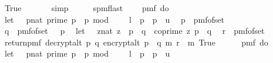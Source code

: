 \begin{isabellebody}
\ \ True{\isachardoublequoteclose}\ \isanewline
\ \ \ \ \isamarkupfalse%
\ simp\isanewline
\isanewline
\ \ \isamarkupfalse%
\ \isamarkupfalse%
\ spmf{\isacharunderscore}{\kern0pt}last{\isacharcolon}{\kern0pt}\ \ {\isachardoublequoteopen}\isanewline
\ \ pmf\ {\isacharparenleft}{\kern0pt}do\ {\isacharbraceleft}{\kern0pt}\isanewline
\ \ let\ {\isasymK}\ {\isacharequal}{\kern0pt}\ {\isacharbraceleft}{\kern0pt}{\isacharparenleft}{\kern0pt}p{\isacharcolon}{\kern0pt}{\isacharcolon}{\kern0pt}nat{\isacharparenright}{\kern0pt}{\isachardot}{\kern0pt}\ prime\ p\ {\isasymand}\ p\ mod\ {}\ {\isacharequal}{\kern0pt}\ {}\ {\isasymand}\ l\ {\isasymle}\ p\ {\isasymand}\ p\ {\isasymle}\ u{\isacharbraceright}{\kern0pt}{\isacharsemicolon}{\kern0pt}\isanewline
\ \ p\ {\isasymleftarrow}\ pmf{\isacharunderscore}{\kern0pt}of{\isacharunderscore}{\kern0pt}set\ {\isasymK}{\isacharsemicolon}{\kern0pt}\ \isanewline
\ \ q\ {\isasymleftarrow}\ pmf{\isacharunderscore}{\kern0pt}of{\isacharunderscore}{\kern0pt}set\ {\isacharparenleft}{\kern0pt}{\isasymK}\ {\isacharminus}{\kern0pt}\ {\isacharbraceleft}{\kern0pt}p{\isacharbraceright}{\kern0pt}{\isacharparenright}{\kern0pt}{\isacharsemicolon}{\kern0pt}\isanewline
\ \ let\ {\isasymZ}\ {\isacharequal}{\kern0pt}\ {\isacharbraceleft}{\kern0pt}{\isacharparenleft}{\kern0pt}z{\isacharcolon}{\kern0pt}{\isacharcolon}{\kern0pt}nat{\isacharparenright}{\kern0pt}{\isachardot}{\kern0pt}\ z\ {\isacharless}{\kern0pt}\ p\ {\isacharasterisk}{\kern0pt}\ q\ {\isasymand}\ coprime\ z\ {\isacharparenleft}{\kern0pt}p\ {\isacharasterisk}{\kern0pt}\ q{\isacharparenright}{\kern0pt}{\isacharbraceright}{\kern0pt}{\isacharsemicolon}{\kern0pt}\isanewline
\ \ r\ {\isasymleftarrow}\ pmf{\isacharunderscore}{\kern0pt}of{\isacharunderscore}{\kern0pt}set\ {\isasymZ}{\isacharsemicolon}{\kern0pt}\isanewline
\ \ return{\isacharunderscore}{\kern0pt}pmf\ {\isacharparenleft}{\kern0pt}decrypt{\isacharunderscore}{\kern0pt}alt\ p\ q\ {\isacharparenleft}{\kern0pt}encrypt{\isacharunderscore}{\kern0pt}alt\ {\isacharparenleft}{\kern0pt}p\ {\isacharasterisk}{\kern0pt}\ q{\isacharparenright}{\kern0pt}\ m\ r{\isacharparenright}{\kern0pt}\ {\isacharequal}{\kern0pt}\ m{\isacharparenright}{\kern0pt}{\isacharbraceright}{\kern0pt}{\isacharparenright}{\kern0pt}\ True\isanewline
\ \ {\isacharequal}{\kern0pt}\ \isanewline
\ \ pmf\ {\isacharparenleft}{\kern0pt}do\ {\isacharbraceleft}{\kern0pt}\isanewline
\ \ let\ {\isasymK}\ {\isacharequal}{\kern0pt}\ {\isacharbraceleft}{\kern0pt}{\isacharparenleft}{\kern0pt}p{\isacharcolon}{\kern0pt}{\isacharcolon}{\kern0pt}nat{\isacharparenright}{\kern0pt}{\isachardot}{\kern0pt}\ prime\ p\ {\isasymand}\ p\ mod\ {}\ {\isacharequal}{\kern0pt}\ {}\ {\isasymand}\ l\ {\isasymle}\ p\ {\isasymand}\ p\ {\isasymle}\ u{\isacharbraceright}{\kern0pt}{\isacharsemicolon}{\kern0pt}\isanewline

\end{isabellebody}
